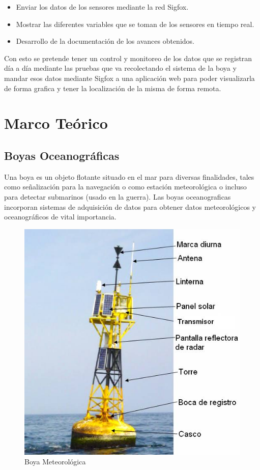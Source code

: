 \documentclass[12pt]{book}
\begin{document}
\begin{itemize}
	\item Enviar los datos de los sensores mediante la red Sigfox.
	\item Mostrar las diferentes variables que se toman de los sensores en tiempo real.
	\item Desarrollo de la documentación de los avances obtenidos.
\end{itemize}

Con esto se pretende tener un control y monitoreo de los datos que se registran día a día mediante las pruebas que va recolectando el sistema de la boya y mandar esos datos mediante Sigfox a una aplicación web para poder visualizarla de forma grafica y tener la localización de la misma de forma remota.


	
\chapter{Marco Teórico}

\section{Boyas Oceanográficas}
 Una boya es un objeto flotante situado en el mar para diversas finalidades, tales como señalización para la navegación o como estación meteorológica o incluso para detectar submarinos (usado en la guerra). Las boyas oceanograficas incorporan sistemas de adquisición de datos para obtener datos meteorológicos y oceanográficos de vital importancia.
 \begin{figure}[h]
 	\centering
 	\includegraphics[width=0.5\linewidth]{imagenes/boya}
 	\caption[Boya Meteorológica ]{Boya Meteorológica}
 	\label{fig:boya}
 \end{figure}
\vspace{5cm}
\end{document}

